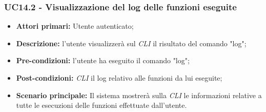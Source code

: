 \subsubsection{UC14.2 - Visualizzazione del log delle funzioni eseguite}
\begin{itemize}
	\item \textbf{Attori primari:} Utente autenticato;
	\item \textbf{Descrizione:} l'utente visualizzerà sul \textit{CLI\glo} il risultato del comando "log";
	\item \textbf{Pre-condizioni:} l'utente ha eseguito il comando "log";
	\item \textbf{Post-condizioni:} \textit{CLI\glo} il log relativo alle funzioni da lui eseguite;
	\item \textbf{Scenario principale:} Il sistema mostrerà sulla \textit{CLI\glo} le informazioni relative a tutte le esecuzioni delle funzioni effettuate dall'utente.
\end{itemize}
